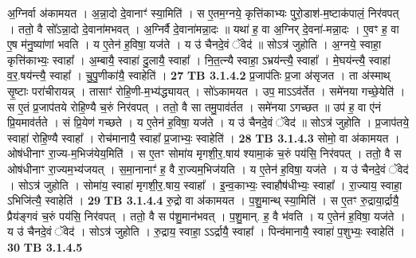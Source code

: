 \documentclass[17pt]{extarticle}
\begin{document}
{{                  अ॒ग्निर्वा अ॑कामयत । अ॒न्ना॒दो दे॒वानाꣳ॑ स्या॒मिति॑ । स ए॒तम॒ग्नये॒ कृत्ति॑काभ्यः पुरो॒डाश॑-म॒ष्टाक॑पालं॒ निर॑वपत् । ततो॒ वै सो᳚ऽन्ना॒दो दे॒वाना॑मभवत् । अ॒ग्निर्वै दे॒वाना॑मन्ना॒दः ॥ यथा॑ ह॒ वा अ॒ग्निर् दे॒वना॑-मन्ना॒दः । ए॒वꣳ ह॒ वा ए॒ष म॑नु॒ष्या॑णां भवति । य ए॒तेन॑ ह॒विषा॒ यज॑ते । य उ॑ चैनदे॒वं ॅवेद॑ ॥ सोऽत्र॑ जुहोति । अ॒ग्नये॒ स्वाहा॒ कृत्ति॑काभ्यः॒ स्वाहा᳚ । अ॒म्बायै॒ स्वाहा॑ दु॒लायै॒ स्वाहा᳚ । नि॒त॒त्न्यै स्वाहा॒ ऽभ्रय॑न्त्यै॒ स्वाहा᳚ । मे॒घय॑न्त्यै॒ स्वाहा॑ व॒र॒.षय॑न्त्यै॒ स्वाहा᳚ । चु॒पु॒णीका॑यै॒ स्वाहेति॑ । \textbf{ 27} \newline
                  \newline
                                \textbf{ TB 3.1.4.2} \newline
                  प्र॒जाप॑तिः प्र॒जा अ॑सृजत । ता अ॑स्माथ् सृ॒ष्टाः परा॑चीरायन्न् । तासाꣳ॑ रोहि॒णी-म॒भ्य॑द्ध्यायत् । सो॑ऽकामयत । उप॒ माऽऽव॑र्तेत । समे॑नया गच्छे॒येति॑ । स ए॒तं प्र॒जाप॑तये रोहि॒ण्यै च॒रुं निर॑वपत् । ततो॒ वै सा तमु॒पाव॑र्तत । समे॑नया ऽगच्छत ॥ उप॑ ह॒ वा ए॑नं प्रि॒यमाव॑र्तते । सं प्रि॒येण॑ गच्छते । य ए॒तेन॑ ह॒विषा॒ यज॑ते । य उ॑ चैनदे॒वं ॅवेद॑ ॥ सोऽत्र॑ जुहोति । प्र॒जाप॑तये॒ स्वाहा॑ रोहि॒ण्यै स्वाहा᳚ । रोच॑मानायै॒ स्वाहा᳚ प्र॒जाभ्यः॒ स्वाहेति॑ । \textbf{ 28} \newline
                  \newline
                                \textbf{ TB 3.1.4.3} \newline
                  सोमो॒ वा अ॑कामयत । ओष॑धीनाꣳ रा॒ज्य-म॒भिज॑येय॒मिति॑ । स ए॒तꣳ सोमा॑य मृगशी॒र॒.षाय॑ श्यामा॒कं च॒रुं पय॑सि॒ निर॑वपत् । ततो॒ वै स ओष॑धीनाꣳ रा॒ज्यम॒भ्य॑जयत् । स॒मा॒नानाꣳ॑ ह॒ वै रा॒ज्यम॒भिज॑यति । य ए॒तेन॑ ह॒विषा॒ यज॑ते । य उ॑ चैनदे॒वं ॅवेद॑ । सोऽत्र॑ जुहोति । सोमा॑य॒ स्वाहा॑ मृगशी॒र॒.षाय॒ स्वाहा᳚ । इ॒न्व॒काभ्यः॒ स्वाहौष॑धीभ्यः॒ स्वाहा᳚ । रा॒ज्याय॒ स्वाहा॒ ऽभिजि॑त्यै॒ स्वाहेति॑ । \textbf{ 29} \newline
                  \newline
                                \textbf{ TB 3.1.4.4} \newline
                  रु॒द्रो वा अ॑कामयत । प॒शु॒मान्थ् स्या॒मिति॑ । स ए॒तꣳ रु॒द्राया॒र्द्रायै॒ प्रैय॑ङ्गवं च॒रुं पय॑सि॒ निर॑वपत् । ततो॒ वै स प॑शु॒मान॑भवत् । प॒शु॒मान्. ह॒ वै भ॑वति । य ए॒तेन॑ ह॒विषा॒ यज॑ते । य उ॑ चैनदे॒वं ॅवेद॑ । सोऽत्र॑ जुहोति । रु॒द्राय॒ स्वाहा॒ ऽऽर्द्रायै॒ स्वाहा᳚ । पिन्व॑मानायै॒ स्वाहा॑ प॒शुभ्यः॒ स्वाहेति॑ । \textbf{ 30} \newline
                  \newline
                                \textbf{ TB 3.1.4.5} \newline
}}
\end{document}
